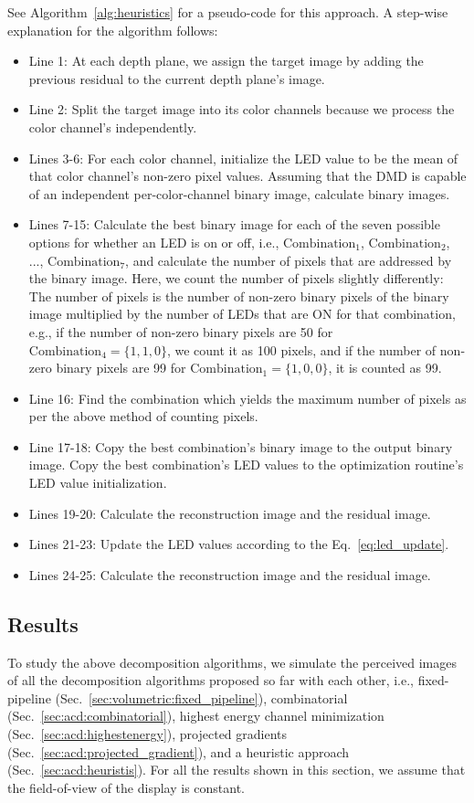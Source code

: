 

See Algorithm~\ref{alg:heuristics} for a pseudo-code for this approach. A step-wise explanation for the algorithm follows:
\begin{itemize}
    \item Line 1: At each depth plane, we assign the target image by adding the previous residual to the current depth plane's image. 
    \item Line 2: Split the target image into its color channels because we process the color channel's independently.
    \item Lines 3-6: For each color channel, initialize the LED value to be the mean of that color channel's non-zero pixel values. Assuming that the DMD is capable of an independent per-color-channel binary image, calculate binary images.
    \item Lines 7-15: Calculate the best binary image for each of the seven possible options for whether an LED is on or off, i.e., $\text{Combination}_1$, $\text{Combination}_2$, ..., $\text{Combination}_7$, and calculate the number of pixels that are addressed by the binary image. Here, we count the number of pixels slightly differently: The number of pixels is the number of non-zero binary pixels of the binary image multiplied by the number of LEDs that are ON for that combination, e.g., if the number of non-zero binary pixels are 50 for $\text{Combination}_4 = \{1,1,0\}$, we count it as 100 pixels, and if the number of non-zero binary pixels are 99 for $\text{Combination}_1=\{1,0,0\}$, it is counted as 99. 
    \item Line 16: Find the combination which yields the maximum number of pixels as per the above method of counting pixels. 
    \item Line 17-18: Copy the best combination's binary image to the output binary image. Copy the best combination's LED values to the optimization routine's LED value initialization.
    \item Lines 19-20: Calculate the reconstruction image and the residual image.
    \item Lines 21-23: Update the LED values according to the Eq.~\ref{eq:led_update}.
    \item Lines 24-25: Calculate the reconstruction image and the residual image.
\end{itemize}


\subsection{Results}
\label{sec:volumetric:acd:results}
To study the above decomposition algorithms, we simulate the perceived images of all the decomposition algorithms proposed so far with each other, i.e., fixed-pipeline (Sec.~\ref{sec:volumetric:fixed_pipeline}), combinatorial (Sec.~\ref{sec:acd:combinatorial}), highest energy channel minimization (Sec.~\ref{sec:acd:highestenergy}), projected gradients (Sec.~\ref{sec:acd:projected_gradient}), and a heuristic approach (Sec.~\ref{sec:acd:heuristis}). For all the results shown in this section, we assume that the field-of-view of the display is constant. 


